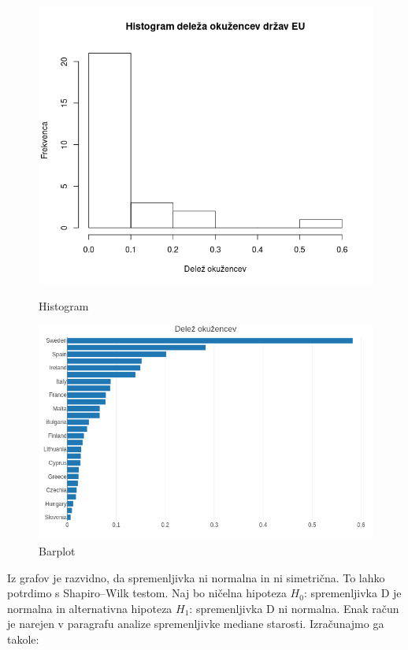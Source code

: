 \documentclass[a4paper,11pt]{article}
\begin{document}
\begin{figure}[!htb]
   \begin{minipage}{0.5\textwidth}
     \centering
     \includegraphics[width=1\linewidth]{histogram_delez_okuzenih}
     \caption{Histogram}\label{Fig:Data1}
   \end{minipage}\hfill
   \begin{minipage}{0.5\textwidth}
     \centering
     \includegraphics[width=1\linewidth]{barplot_delez_okuzenih}
     \caption{Barplot}\label{Fig:Data2}
   \end{minipage}
\end{figure}
Iz grafov je razvidno, da spremenljivka ni normalna in ni simetrična. To lahko potrdimo s Shapiro–Wilk testom. Naj bo ničelna hipoteza \(H_0\): spremenljivka D je normalna in alternativna hipoteza \(H_1\): spremenljivka D ni normalna. Enak račun je narejen v paragrafu analize spremenljivke mediane starosti. Izračunajmo ga takole:
\end{document}
